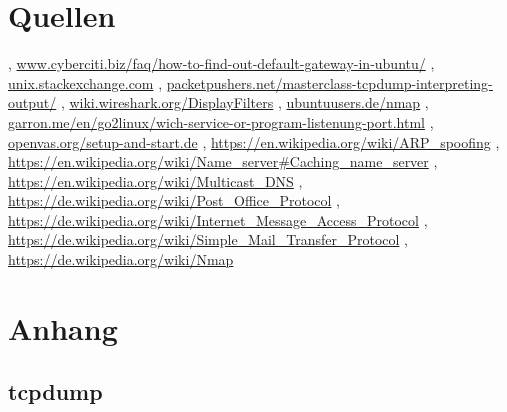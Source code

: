 \documentclass[12pt]{article}
\theoremstyle{plain}
\begin{document}
\section{Quellen}
\begin{thebibliography}{50}
\bibitem  [Cyberciti], \url{www.cyberciti.biz/faq/how-to-find-out-default-gateway-in-ubuntu/}
\bibitem [Stackexchange] , \url{unix.stackexchange.com}
\bibitem [Tcpdump], \url{packetpushers.net/masterclass-tcpdump-interpreting-output/}
\bibitem [Wireshark], \url{wiki.wireshark.org/DisplayFilters}
\bibitem [Nmap 1], \url{ubuntuusers.de/nmap}
\bibitem [Nmap 2], \url{garron.me/en/go2linux/wich-service-or-program-listenung-port.html}
\bibitem [OpenVAS], \url{openvas.org/setup-and-start.de}
, \url{https://en.wikipedia.org/wiki/ARP_spoofing}
\bibitem [DNS], \url{https://en.wikipedia.org/wiki/Name_server#Caching_name_server}
\bibitem [DNS 2], \url{https://en.wikipedia.org/wiki/Multicast_DNS}
\bibitem [POP], \url{https://de.wikipedia.org/wiki/Post_Office_Protocol}
\bibitem [IMAP], \url{https://de.wikipedia.org/wiki/Internet_Message_Access_Protocol}
\bibitem [SMTP], \url{https://de.wikipedia.org/wiki/Simple_Mail_Transfer_Protocol}
\bibitem [Nmap 3], \url{https://de.wikipedia.org/wiki/Nmap}	
\end{thebibliography}
\newpage
\section{Anhang}
\subsection{tcpdump}
\end{document}
